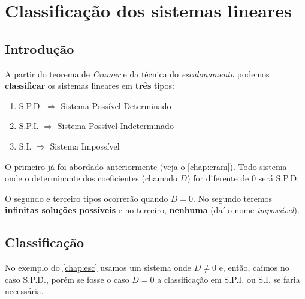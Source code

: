 \chapter{Classificação dos sistemas lineares}

\section{Introdução}

A partir do teorema de \textit{Cramer} e da técnica do \textit{escalonamento} podemos \textbf{classificar} os sistemas lineares em \textbf{três} tipos:

\begin{enumerate}[label=(\Roman*), align=Center]
    \item S.P.D. $\Rightarrow$ Sistema Possível Determinado
    \item S.P.I. $\Rightarrow$ Sistema Possível Indeterminado
    \item S.I. $\Rightarrow$ Sistema Impossível

\end{enumerate}

O primeiro já foi abordado anteriormente (veja o \autoref{chap:cram}). Todo sistema onde o determinante dos coeficientes (chamado $D$) for diferente de $0$ será S.P.D.

O segundo e terceiro tipos ocorrerão quando $D=0$. No segundo teremos \textbf{infinitas soluções possíveis} e no terceiro, \textbf{nenhuma} (daí o nome \textit{impossível}).

\section{Classificação}
No exemplo do \autoref{chap:esc} usamos um sistema onde $D\neq 0$ e, então, caímos no caso S.P.D., porém se fosse o caso $D=0$ a classificação em S.P.I. ou S.I. se faria necessária.

